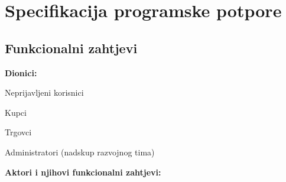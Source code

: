 \chapter{Specifikacija programske potpore}
		
	\section{Funkcionalni zahtjevi}
		
			\noindent \textbf{Dionici:}
			
			\begin{packed_enum}
				
				\item Neprijavljeni korisnici
				\item Kupci	
				\item Trgovci
				\item Administratori (nadskup razvojnog tima)
				
			\end{packed_enum}
			
			\noindent \textbf{Aktori i njihovi funkcionalni zahtjevi:}
			
